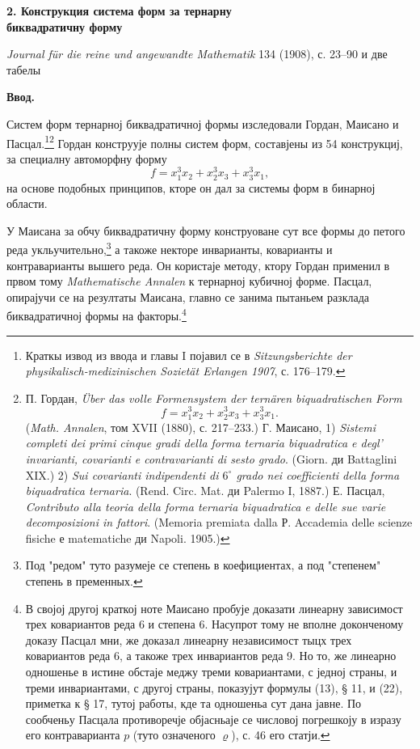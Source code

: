 ﻿\documentclass[11pt]{article}
\begin{document}
\begin{center}
{\Large\bfseries 2. Конструкция система форм за тернарну\\ биквадратичну форму}\par
\vspace{1.5em}
\emph{Journal für die reine und angewandte Mathematik} 134 (1908), с. 23--90 и две табелы
\end{center}

\vspace{3em}

\begin{center}
\textbf{Ввод.}
\end{center}

Систем форм тернарној биквадратичној формы изследовали Гордан, Маисано и Пасцал.\footnote{Краткы извод из ввода и главы I појавил се в \emph{Sitzungsberichte der physikalisch-medizinischen Sozietät Erlangen 1907}, с. 176--179.}\footnote{П. Гордан, \emph{Über das volle Formensystem der ternären biquadratischen Form}
\[
f=x_1^3x_2+x_2^3x_3+x_3^3x_1.
\]
(\emph{Math. Annalen}, том XVII (1880), с. 217--233.)
Г. Маисано, 1) \emph{Sistemi completi dei primi cinque gradi della forma ternaria biquadratica e degl' invarianti, covarianti e contravarianti di sesto grado}. (Giorn. ди Battaglini XIX.)
2) \emph{Sui covarianti indipendenti di $6^\circ$ grado nei coefficienti della forma biquadratica ternaria}. (Rend. Circ. Mat. ди Palermo I, 1887.)
Е. Пасцал, \emph{Contributo alla teoria della forma ternaria biquadratica e delle sue varie decomposizioni in fattori}. (Memoria premiata dalla Р. Accademia delle scienze fisiche е matematiche ди Napoli. 1905.)}
Гордан конструује полны систем форм, составјены из 54 конструкциј, за специалну автоморфну форму
\[
f=x_1^3x_2+x_2^3x_3+x_3^3x_1,
\]
на основе подобных принципов, кторе он дал за системы форм в бинарној области.

У Маисана за обчу биквадратичну форму конструоване сут все формы до петого реда укльучительно,\footnote{Под "редом" туто разумеје се степень в коефициентах, а под "степенем" степень в пременных.}
а такоже некторе инварианты, коварианты и контраварианты вышего реда. Он користаје методу, ктору Гордан применил в првом тому \emph{Mathematische Annalen} к тернарној кубичној форме. Пасцал, опирајучи се на резултаты Маисана, главно се занима пытаньем разклада биквадратичној формы на факторы.\footnote{В својој другој краткој ноте Маисано пробује доказати линеарну зависимост трех ковариантов реда 6 и степена 6. Насупрот тому не вполне доконченому доказу Пасцал мни, же доказал линеарну независимост тыцх трех ковариантов реда 6, а такоже трех инвариантов реда 9. Но то, же линеарно одношенье в истине обстаје меджу треми ковариантами, с једној страны, и треми инвариантами, с другој страны, показујут формулы (13), § 11, и (22), приметка к § 17, тутој работы, кде та одношеньа сут дана јавне. По сообченьу Пасцала противоречје објасньаје се числовој погрешкоју в изразу его контраварианта $p$ (туто означеного $\varrho$), с. 46 его статји.}
\end{document}
